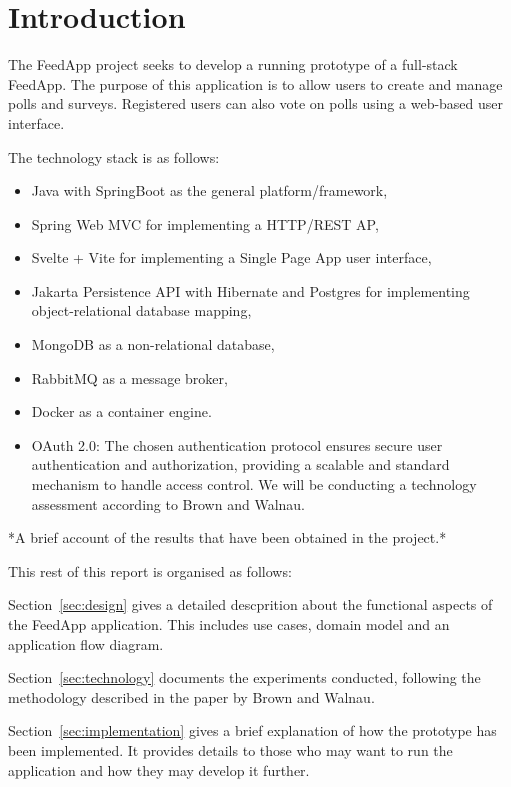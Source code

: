 \section{Introduction}
\label{sec:introduction}

The FeedApp project seeks to develop a running prototype of a full-stack FeedApp. The purpose of this application is to allow users to create and manage polls and surveys. Registered users can also vote on polls using a web-based user interface. 
\medskip

\noindent
The technology stack is as follows:
\begin{itemize}
\item Java with SpringBoot as the general platform/framework,
\item Spring Web MVC for implementing a HTTP/REST AP,
\item Svelte + Vite for implementing a Single Page App user interface,
\item Jakarta Persistence API with Hibernate and Postgres for implementing object-relational database mapping,
\item MongoDB as a non-relational database,
\item RabbitMQ as a message broker,
\item Docker as a container engine.
\item OAuth 2.0: The chosen authentication protocol ensures secure user authentication and authorization, providing a scalable and standard mechanism to handle access control. We will be conducting a technology assessment according to Brown and Walnau.\cite{brown:96}
\end{itemize}

\noindent
 *A brief account of the results that have been obtained in the project.*
\medskip

\noindent
This rest of this report is organised as follows:

Section~\ref{sec:design} gives a detailed descprition about the functional aspects of the FeedApp application. This includes use cases, domain model and an application flow diagram.

Section~\ref{sec:technology} documents the experiments conducted, following the methodology described in the paper by Brown and Walnau.

Section~\ref{sec:implementation} gives a brief explanation of how the prototype has been implemented. It provides details to those who may want to run the application and how they may develop it further.

